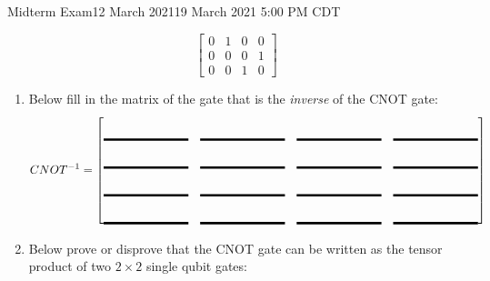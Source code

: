 \documentclass[12pt]{article}
\newcommand{\Blank}{\mbox{\vrule width 1in depth 2pt}\vrule width 0pt height 2.0em}
\begin{document}
\begin{assignment}{Midterm Exam}{12 March 2021}{19 March 2021 5:00 PM CDT}
\begin{enumerate}
\[\begin{bmatrix}
0 & 1 & 0 & 0 \\
0 & 0 & 0 & 1 \\
0 & 0 & 1 & 0
\end{bmatrix}
\]
\begin{enumerate}
  \item{} Below fill in the matrix of the gate that is the \emph{inverse} of
the CNOT gate:
\[
CNOT^{-1}=
\begin{bmatrix}
\Blank{} & \Blank{} & \Blank{} & \Blank{}  \\
\Blank{} & \Blank{} & \Blank{} & \Blank{}  \\
\Blank{} & \Blank{} & \Blank{} & \Blank{}  \\
\Blank{} & \Blank{} & \Blank{} & \Blank{} 
\end{bmatrix}
\]
 \item{} Below prove or disprove that the CNOT gate can be written as the
tensor product of two $2\times2$ single qubit gates:
\end{enumerate}

\end{enumerate}

\end{assignment}
\Bpage{}
\end{document}
